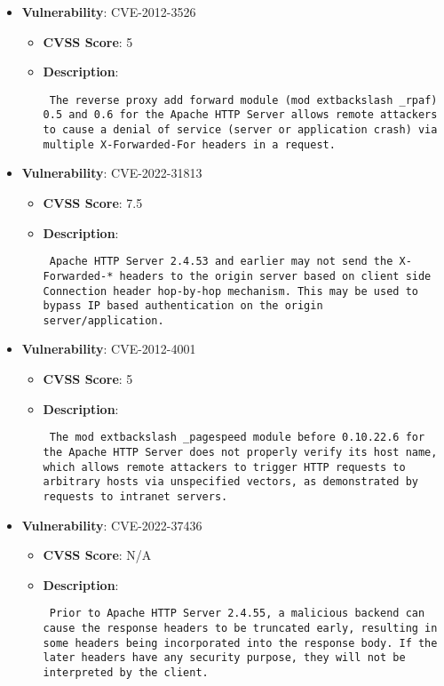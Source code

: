 \documentclass{article}
\begin{document}
\begin{itemize}
        \item \textbf{Vulnerability}: CVE-2012-3526
        \begin{itemize}
            \item \textbf{CVSS Score}:  5 
            \item \textbf{Description}: \parbox{\linewidth}{\texttt{ The reverse proxy add forward module (mod	extbackslash _rpaf) 0.5 and 0.6 for the Apache HTTP Server allows remote attackers to cause a denial of service (server or application crash) via multiple X-Forwarded-For headers in a request. }}
        \end{itemize}
    
        \item \textbf{Vulnerability}: CVE-2022-31813
        \begin{itemize}
            \item \textbf{CVSS Score}:  7.5 
            \item \textbf{Description}: \parbox{\linewidth}{\texttt{ Apache HTTP Server 2.4.53 and earlier may not send the X-Forwarded-* headers to the origin server based on client side Connection header hop-by-hop mechanism. This may be used to bypass IP based authentication on the origin server/application. }}
        \end{itemize}
    
        \item \textbf{Vulnerability}: CVE-2012-4001
        \begin{itemize}
            \item \textbf{CVSS Score}:  5 
            \item \textbf{Description}: \parbox{\linewidth}{\texttt{ The mod	extbackslash _pagespeed module before 0.10.22.6 for the Apache HTTP Server does not properly verify its host name, which allows remote attackers to trigger HTTP requests to arbitrary hosts via unspecified vectors, as demonstrated by requests to intranet servers. }}
        \end{itemize}
    
        \item \textbf{Vulnerability}: CVE-2022-37436
        \begin{itemize}
            \item \textbf{CVSS Score}:  N/A 
            \item \textbf{Description}: \parbox{\linewidth}{\texttt{ Prior to Apache HTTP Server 2.4.55, a malicious backend can cause the response headers to be truncated early, resulting in some headers being incorporated into the response body. If the later headers have any security purpose, they will not be interpreted by the client. }}
        \end{itemize}
    

\end{itemize}
\end{document}

